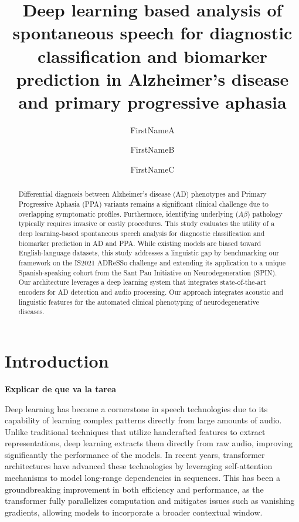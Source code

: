 \documentclass{Odyssey2026}
\title{Deep learning based analysis of spontaneous speech for diagnostic classification and biomarker prediction in Alzheimer’s disease and primary progressive aphasia
}
\author[affiliation={1}]{FirstNameA}{LastNameA}
\author[affiliation={2,3}]{FirstNameB}{LastNameB}
\author[affiliation={1,3}]{FirstNameC}{LastNameC}
\affiliation{First Department}{First Affiliation}{First Country}
\affiliation{Second Department}{Second Affiliation}{Second Country}
\affiliation{}{Just Institute}{And Country}
\begin{document}
\maketitle


\begin{abstract}

Differential diagnosis between Alzheimer’s disease (AD) phenotypes and Primary Progressive Aphasia (PPA) variants remains a significant clinical challenge due to overlapping symptomatic profiles. Furthermore, identifying underlying ($A\beta$) pathology typically requires invasive or costly procedures. This study evaluates the utility of a deep learning-based spontaneous speech analysis for diagnostic classification and biomarker prediction in AD and PPA. While existing models are biased toward English-language datasets, this study addresses a linguistic gap by benchmarking our framework on the IS2021 ADReSSo challenge and extending its application to a unique Spanish-speaking cohort from the Sant Pau Initiative on Neurodegeneration (SPIN). Our architecture leverages a deep learning system that integrates state-of-the-art encoders for AD detection and audio processing. Our approach integrates acoustic and linguistic features for the automated clinical phenotyping of neurodegenerative diseases.
\end{abstract}



\section{Introduction}

\textbf{Explicar de que va la tarea}\\
\textbf{}

Deep learning has become a cornerstone in speech technologies due to its capability of learning complex patterns directly from large amounts of audio. Unlike traditional techniques that utilize handcrafted features to extract representations, deep learning extracts them directly from raw audio, improving significantly the performance of the models. In recent years, transformer architectures \cite{NIPS2017_3f5ee243} have advanced these technologies by leveraging self-attention mechanisms to model long-range dependencies in sequences. This has been a groundbreaking improvement in both efficiency and performance, as the transformer fully parallelizes computation and mitigates issues such as vanishing gradients, allowing models to incorporate a broader contextual window.
\end{document}

